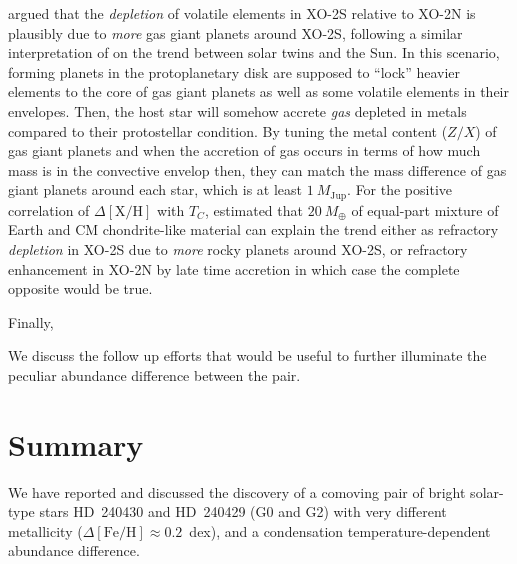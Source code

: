 \documentclass[manuscript]{aastex6}
\newcommand*\elem[1]{\ensuremath{\mathrm{#1}}}
\newcommand*\elemH[1]{\ensuremath{[\mathrm{#1}/\elem{H}]}}
\newcommand*{\feh}{\ensuremath{\elemH{Fe}}}
\newcommand{\Tcondens}{\ensuremath{T_C}}
\newcommand{\mearth}{\ensuremath{M_\oplus}}
\newcommand{\mjupiter}{\ensuremath{M_\mathrm{Jup}}}
\begin{document}
\citealt{Ramirez:2015aa} argued that the {\it depletion} of
volatile elements in XO-2S relative to XO-2N is plausibly
due to {\it more} gas giant planets around XO-2S,
following a similar interpretation of \citealt{Melendez:2009aa}
on the trend between solar twins and the Sun.
In this scenario, forming planets in the protoplanetary disk
are supposed to ``lock'' heavier elements to the core of gas giant
planets as well as some volatile elements in their envelopes.
Then, the host star will somehow accrete {\it gas} depleted in
metals compared to their protostellar condition.
By tuning the metal content ($Z/X$) of gas giant planets
and when the accretion of gas occurs in terms of how much mass
is in the convective envelop then, they can match
the mass difference of gas giant planets around each star,
which is at least $1~\mjupiter$.
For the positive correlation of $\Delta\elemH{X}$ with \Tcondens,
\citealt{Ramirez:2015aa} estimated that $20~\mearth$
of equal-part mixture of Earth and CM chondrite-like material
can explain the trend either as
refractory {\it depletion} in XO-2S due to {\it more} rocky planets
around XO-2S, or refractory enhancement in XO-2N by late time accretion
in which case the complete opposite would be true.

Finally, \citealt{Biazzo:2015aa} 






We discuss the follow up efforts that would be useful to further
illuminate the peculiar abundance difference between the pair.



\section{Summary}
\label{sec:summary}

We have reported and discussed the discovery of a comoving pair of bright solar-type stars
HD~240430 and HD~240429 (G0 and G2)
with very different metallicity ($\Delta\feh \approx 0.2$~dex),
and a condensation temperature-dependent abundance difference.

\end{document}
